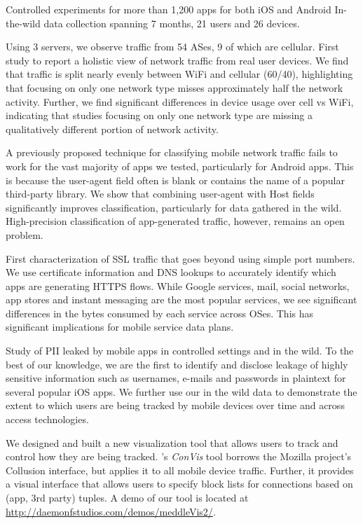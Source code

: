Controlled experiments for more than 1,200 apps for both iOS and Android
In-the-wild data collection spanning 7 months, 21 users and 26 devices.

Using 3 \platname{} servers, we observe traffic from 54 ASes, 9 of which are cellular. 
First study to report a holistic view of network traffic from real user devices. We find that 
traffic is split nearly evenly between WiFi and cellular (60/40), highlighting that focusing 
on only one network type misses approximately half the network activity. Further, we 
find significant differences in device usage over cell vs WiFi, indicating that studies focusing 
on only one network type are missing a qualitatively different portion of network activity. 

A previously proposed technique for classifying mobile network traffic fails to work for the 
vast majority of apps we tested, particularly for Android apps. This is because the user-agent 
field often is blank or contains the name of a popular third-party library. We show that combining 
user-agent with Host fields significantly improves classification, particularly for data gathered 
in the wild. High-precision classification of app-generated traffic, however, remains an open problem. 

First characterization of SSL traffic that goes beyond using simple port numbers. We use 
certificate information and DNS lookups to accurately identify which apps are generating HTTPS flows.
While Google services, mail, social networks, app stores and instant messaging are the most 
popular services, we see significant differences in the bytes consumed by each service across 
OSes. This has significant implications for mobile service data plans.

Study of PII leaked by mobile apps in controlled settings and in the wild. To the best of our knowledge, 
we are the first to identify and disclose leakage of highly sensitive information such as usernames, 
e-mails and passwords in plaintext for several popular iOS apps. We further use our in the wild 
data to demonstrate the extent to which users are being tracked by mobile devices over time 
and across access technologies. 

We designed and built a new visualization tool that allows users to track and control how 
they are being tracked. \platname{}'s \emph{ConVis} tool borrows the Mozilla project's Collusion 
interface, but applies it to all mobile device traffic. Further, it provides a visual interface that allows 
 users to specify block lists for connections based on (app, 3rd party) tuples. A demo of our tool is 
 located at \url{http://daemonfstudios.com/demos/meddleVis2/}.
 





